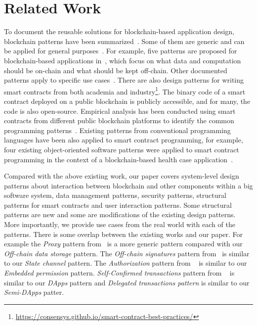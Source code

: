 \section{Related Work}
\label{sec:relatedwork}


To document the reusable solutions for blockchain-based application design, blockchain patterns have been summarized~\cite{Dilum:migrationpattern,Lu:patterns,2020-Muehlberger-BPM-BC,Eberhardt2017,patternICSA2018,securityblockchainpattern}.
Some of them are generic and can be applied for general purposes~\cite{2020-Muehlberger-BPM-BC,Eberhardt2017,patternICSA2018}. For example, five patterns are proposed for blockchain-based applications in~\cite{Eberhardt2017}, which focus on what data and computation should be on-chain and what should be kept off-chain. Other documented patterns apply to specific use cases~\cite{Dilum:migrationpattern,Lu:patterns}. 
There are also design patterns for writing smart contracts from both academia and industry\footnote{\url{https://consensys.github.io/smart-contract-best-practices/}}. The binary code of a smart contract deployed on a public blockchain is publicly accessible, and for many, the code is also open-source. Empirical analysis has been conducted using smart contracts from different public blockchain platforms to identify the common programming patterns~\cite{designPatterns1,Zdun:patterns,Zdun:patterns2}. Existing patterns from conventional programming languages have been also applied to smart contract programming, for example, four existing object-oriented software patterns were applied to smart contract programming in the context of a blockchain-based health case application~\cite{factorypattern}.
 
Compared with the above existing work, our paper covers system-level design patterns about interaction between blockchain and other components within a big software system, data management patterns, security patterns, structural patterns for smart contracts and user interaction patterns. Some structural patterns are new and some are modifications of the existing design patterns. More importantly, we provide use cases from the real world with each of the patterns. There is some overlap between the existing works and our paper. For example the \emph{Proxy} pattern from~\cite{factorypattern} is a more generic pattern compared with our \emph{Off-chain data storage} pattern. The \emph{Off-chain signatures} pattern from~\cite{Eberhardt2017} is similar to our \emph{State channel} pattern. The \emph{Authorization} pattern from ~\cite{designPatterns1} is similar to our \emph{Embedded permission} pattern. \emph{Self-Confirmed transactions} pattern from ~\cite{patternICSA2018} is similar to our \emph{DApps} pattern and \emph{Delegated transactions pattern} is similar to our \emph{Semi-DApps} patter. 


